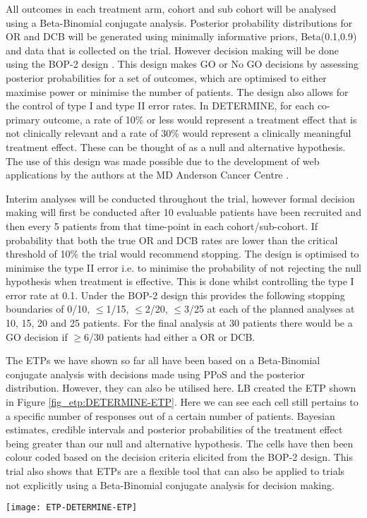 All outcomes in each treatment arm, cohort and sub cohort will be analysed using a Beta-Binomial conjugate analysis. Posterior probability distributions for OR and DCB will be generated using minimally informative priors, Beta(0.1,0.9) and data that is collected on the trial. However decision making will be done using the BOP-2 design \cite{zhouBOP2BayesianOptimal2017,zhouBayesianOptimalPhase2020}. This design makes GO or No GO decisions by assessing posterior probabilities for a set of outcomes, which are optimised to either maximise power or minimise the number of patients. The design also allows for the control of type I and type II error rates. In DETERMINE, for each co-primary outcome, a rate of 10\% or less would represent a treatment effect that is not clinically relevant and a rate of 30\% would represent a clinically meaningful treatment effect. These can be thought of as a null and alternative hypothesis. The use of this design was made possible due to the development of web applications by the authors at the MD Anderson Cancer Centre \cite{tidwellBayesianClinicalTrials2019}. 

Interim analyses will be conducted throughout the trial, however formal decision making will first be conducted after 10 evaluable patients have been recruited and then every 5 patients from that time-point in each cohort/sub-cohort. If probability that both the true OR and DCB rates are lower than the critical threshold of 10\% the trial would recommend stopping. The design is optimised to minimise the type II error i.e. to minimise the probability of not rejecting the null hypothesis when treatment is effective. This is done whilst controlling the type I error rate at 0.1. Under the BOP-2 design this provides the following stopping boundaries of 0/10, $\leq$1/15, $\leq$2/20, $\leq$3/25 at each of the planned analyses at 10, 15, 20 and 25 patients. For the final analysis at 30 patients there would be a GO decision if $\geq$6/30 patients had either a OR or DCB.   

The ETPs we have shown so far all have been based on a Beta-Binomial conjugate analysis with decisions made using PPoS and the posterior distribution. However, they can also be utilised here. LB created the ETP shown in Figure \ref{fig_etp:DETERMINE-ETP}. Here we can see each cell still pertains to a specific number of responses out of a certain number of patients. Bayesian estimates, credible intervals and posterior probabilities of the treatment effect being greater than our null and alternative hypothesis. The cells have then been colour coded based on the decision criteria elicited from the BOP-2 design. This trial also shows that ETPs are a flexible tool that can also be applied to trials not explicitly using a Beta-Binomial conjugate analysis for decision making. 

\begin{sidewaysfigure}[h!]
	\centering
	\caption{ETP for the DETERMINE trial.}
	\label{fig_etp:DETERMINE-ETP}
	\texttt{[image: ETP-DETERMINE-ETP]}
\end{sidewaysfigure} 

\clearpage